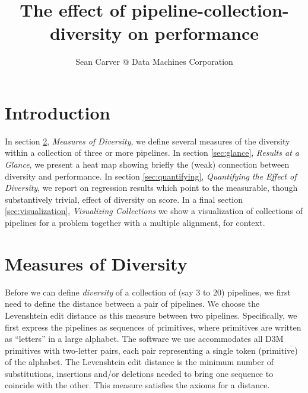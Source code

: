 \documentclass{article}
\title{The effect of pipeline-collection-diversity on performance}
\author{Sean Carver @ Data Machines Corporation}
\begin{document}
\maketitle


\section{Introduction}
In section \ref{sec:measures}, \emph{Measures of Diversity}, we define
several measures of the diversity within a collection of three or more
pipelines. In section \ref{sec:glance}, \emph{Results at a Glance}, we
present a heat map showing briefly the (weak) connection between
diversity and performance. In section \ref{sec:quantifying},
\emph{Quantifying the Effect of Diversity}, we report on regression
results which point to the measurable, though substantively trivial,
effect of diversity on score. In a final section
\ref{sec:visualization}, \emph{Visualizing Collections} we show a
visualization of collections of pipelines for a problem together with
a multiple alignment, for context.

\section{Measures of Diversity}
\label{sec:measures}
Before we can define \emph{diversity} of a collection of (say 3 to 20)
pipelines, we first need to define the distance between a pair of
pipelines.  We choose the Levenshtein edit distance as this measure
between two pipelines.  Specifically, we first express the pipelines
as sequences of primitives, where primitives are written as
``letters'' in a large alphabet.  The software we use accommodates all
D3M primitives with two-letter pairs, each pair representing a single
token (primitive) of the alphabet.  The Levenshtein edit distance is
the minimum number of substitutions, insertions and/or deletions
needed to bring one sequence to coincide with the other.  This measure
satisfies the axioms for a distance.
\end{document}
